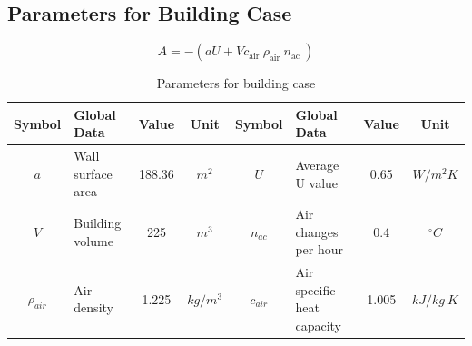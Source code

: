 \documentclass[11pt,oneside,onecolumn,openright]{article}
\begin{document}
\newpage
\subsection{Parameters for Building Case}\label{sec:parameter}
\begin{equation}
A=-\left(a U+V c_{\text {air }} \rho_{\text {air }} n_{\text {ac }}\right)
\end{equation}
\begin{table}[t]
  \centering
  \caption{Parameters for building case}
    \begin{tabular}{clcc|clcc}
    \toprule
\textbf{Symbol} & \textbf{Global Data} & \textbf{Value} & \textbf{Unit} & \textbf{Symbol} &\textbf{Global Data} & \textbf{Value} & \textbf{Unit}\\
    \hline    
  $a$  &Wall surface area & 188.36 & $m^2$ & $U$ & Average U value & 0.65  & $W/m^2K$ \\
  $V$  &Building volume & 225   & $m^3$ & $n_{ac}$& Air changes per hour & 0.4   &  $^\circ C$ \\
   $\rho_{air}$ &Air density & 1.225 & $kg/m^3$ & $c_{air}$ & Air specific heat capacity & 1.005 & $kJ/kg\ K$  \\
    \bottomrule
    \end{tabular}%
  \label{tab:para}%
\end{table}%
\newpage
\end{document}
